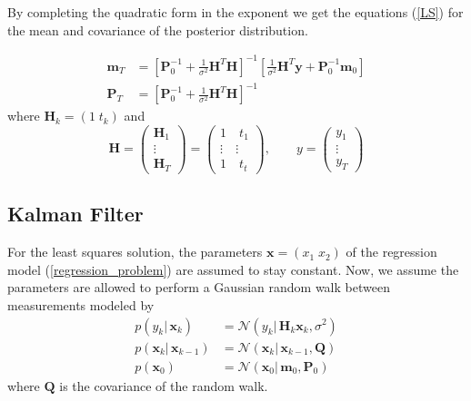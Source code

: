 By completing the quadratic form in the exponent
we get the equations (\ref{LS}) for the mean and covariance
of the posterior distribution.

\begin{equation}
  \label{LS}
  \begin{aligned}
    \mathbf{m}_T &= \left[ \mathbf{P}^{-1}_0 + \frac{1}{\sigma^2} \mathbf{H}^T \mathbf{H}
                   \right]^{-1} \left[\frac{1}{\sigma^2} \mathbf{H}^T \mathbf{y} +
                   \mathbf{P}^{-1}_0 \mathbf{m}_0 \right] \\
    \mathbf{P}_T &= \left[\mathbf{P}_0^{-1} + \frac{1}{\sigma^2} \mathbf{H}^T \mathbf{H}
                 \right]^{-1}
  \end{aligned}
\end{equation}
where $\mathbf{H}_k = (1 \;t_k)$ and
$$ \mathbf{H} =
\begin{pmatrix} \mathbf{H}_1 \\ \vdots \\ \mathbf{H}_T \end{pmatrix}
= \begin{pmatrix}
  1 \quad t_1 \\
  \vdots \quad \vdots \\
  1 \quad t_t
\end{pmatrix},
\quad \quad y = \begin{pmatrix} y_1 \\ \vdots \\ y_T \end{pmatrix}
$$


\subsection{Kalman Filter} \label{KF}
For the least squares solution, the parameters
$\mathbf{x} = (x_{1} \; x_{2})$ of
the regression model (\ref{regression_problem}) are assumed to stay constant.
Now, we assume the parameters are allowed to perform
a Gaussian random walk between measurements modeled by
\begin{align*}
  p(y_k | \, \mathbf{x}_k) &= \mathcal{N}(y_k | \, \mathbf{H}_k \mathbf{x}_k, \sigma^2) \\
  p(\mathbf{x}_k | \, \mathbf{x}_{k-1}) &= \mathcal{N}(\mathbf{x}_k | \,
                               \mathbf{x}_{k-1}, \mathbf{Q}) \\
  p(\mathbf{x}_0) &= \mathcal{N}(\mathbf{x}_0 | \, \mathbf{m}_0, \mathbf{P}_0)
\end{align*}
where $\mathbf{Q}$ is the covariance of the random walk.


